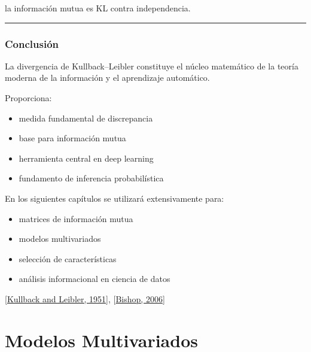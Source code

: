 \documentclass[letterpaper,10pt,english]{jupyterBook}
\begin{document}
\sphinxAtStartPar
la información mutua es KL contra independencia.


\bigskip\hrule\bigskip



\section{Conclusión}
\label{\detokenize{02_mathematical_foundations/kl_divergence:conclusion}}
\sphinxAtStartPar
La divergencia de Kullback–Leibler constituye el núcleo matemático
de la teoría moderna de la información y el aprendizaje automático.

\sphinxAtStartPar
Proporciona:
\begin{itemize}
\item {} 
\sphinxAtStartPar
medida fundamental de discrepancia

\item {} 
\sphinxAtStartPar
base para información mutua

\item {} 
\sphinxAtStartPar
herramienta central en deep learning

\item {} 
\sphinxAtStartPar
fundamento de inferencia probabilística

\end{itemize}

\sphinxAtStartPar
En los siguientes capítulos se utilizará extensivamente para:
\begin{itemize}
\item {} 
\sphinxAtStartPar
matrices de información mutua

\item {} 
\sphinxAtStartPar
modelos multivariados

\item {} 
\sphinxAtStartPar
selección de características

\item {} 
\sphinxAtStartPar
análisis informacional en ciencia de datos

\end{itemize}

\sphinxAtStartPar
{[}\hyperlink{cite.05_appendices/references:id15}{Kullback and Leibler, 1951}{]}, {[}\hyperlink{cite.05_appendices/references:id4}{Bishop, 2006}{]}

\sphinxstepscope


\part{Modelos Multivariados}
\end{document}
